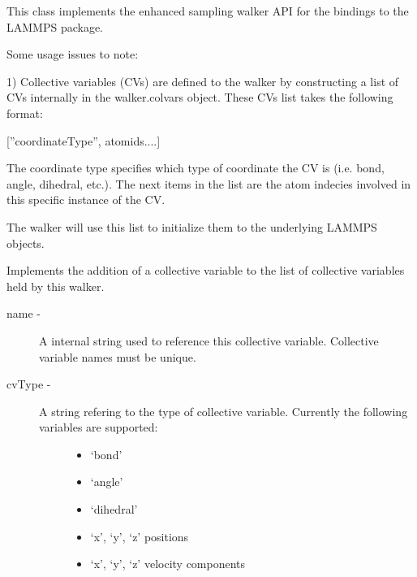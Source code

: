 \documentclass[letterpaper,10pt,english]{sphinxmanual}
\begin{document}
\begin{fulllineitems}
\label{walker_api/walker_api.doc:lammpsWalker.lammpsWalker}
This class implements the enhanced sampling walker API for the bindings to the LAMMPS package.

Some usage issues to note:

1) Collective variables (CVs) are defined to the walker by constructing a list of
CVs internally in the walker.colvars object. These CVs list takes the following
format:

{[}''coordinateType'', atomids....{]}

The coordinate type specifies which type of coordinate the CV is 
(i.e. bond, angle, dihedral, etc.). The next items in the list are the atom 
indecies involved in this specific instance of the CV.

The walker will use this list to initialize them to the underlying LAMMPS objects.

\begin{fulllineitems}
\label{walker_api/walker_api.doc:lammpsWalker.lammpsWalker.addColvars}
Implements the addition of a collective variable to the list of collective variables held by this walker.
\begin{description}
\item[{name - }] \leavevmode
A internal string used to reference this collective variable. Collective variable names must be unique.

\item[{cvType - }] \leavevmode\begin{description}
\item[{A string refering to the type of collective variable. Currently the following variables are supported:}] \leavevmode\begin{itemize}
\item {} 
`bond'

\item {} 
`angle'

\item {} 
`dihedral'

\item {} 
`x', `y', `z' positions

\item {} 
`x', `y', `z' velocity components


\end{itemize}
\end{description}
\end{description}
\end{fulllineitems}
\end{fulllineitems}
\end{document}
